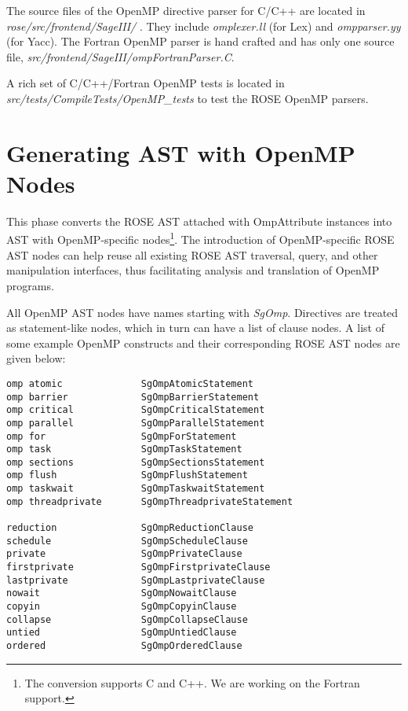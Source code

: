 The source files of the OpenMP directive parser for C/C++ are located in \textit{rose/src/frontend/SageIII/ }.
They include \textit{omplexer.ll} (for Lex) and \textit{ompparser.yy} (for Yacc).
The Fortran OpenMP parser is hand crafted and has only one source file, \textit{src/frontend/SageIII/ompFortranParser.C}. 

A rich set of C/C++/Fortran OpenMP tests is located in \textit{src/tests/CompileTests/OpenMP\_tests} to test the ROSE OpenMP parsers.
\section{Generating AST with OpenMP Nodes}
This phase converts the ROSE AST attached with OmpAttribute instances into
AST with OpenMP-specific nodes\footnote{The conversion supports C and C++.
We are working on the Fortran support.}.
The introduction of OpenMP-specific ROSE AST nodes can help reuse all
existing ROSE AST traversal, query, and other manipulation interfaces, thus
facilitating analysis and translation of OpenMP programs.

All OpenMP AST nodes have names starting with \textit{SgOmp}. 
Directives are treated as statement-like nodes, which in turn can have a list of clause nodes.
A list of some example OpenMP constructs and their corresponding ROSE AST nodes are given below:

{\scriptsize
\begin{verbatim}
omp atomic              SgOmpAtomicStatement
omp barrier             SgOmpBarrierStatement
omp critical            SgOmpCriticalStatement
omp parallel            SgOmpParallelStatement
omp for                 SgOmpForStatement
omp task                SgOmpTaskStatement
omp sections            SgOmpSectionsStatement
omp flush               SgOmpFlushStatement
omp taskwait            SgOmpTaskwaitStatement
omp threadprivate       SgOmpThreadprivateStatement

reduction               SgOmpReductionClause
schedule                SgOmpScheduleClause
private                 SgOmpPrivateClause
firstprivate            SgOmpFirstprivateClause
lastprivate             SgOmpLastprivateClause
nowait                  SgOmpNowaitClause
copyin                  SgOmpCopyinClause
collapse                SgOmpCollapseClause
untied                  SgOmpUntiedClause
ordered                 SgOmpOrderedClause
\end{verbatim}
}
 
